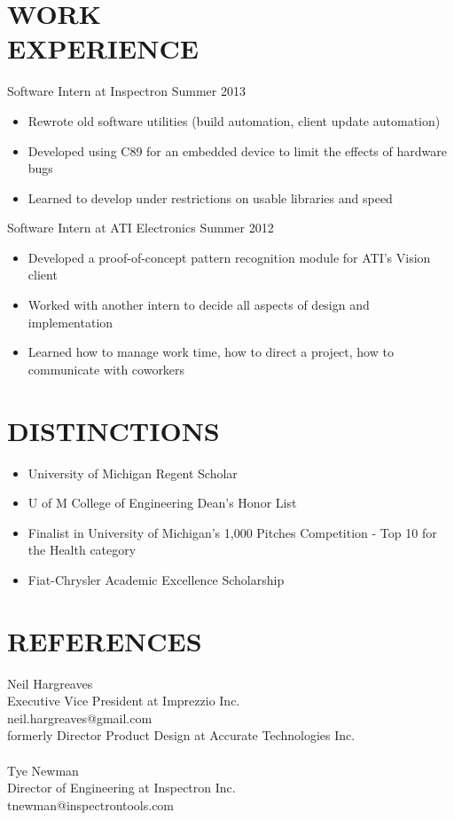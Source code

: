 \documentclass[line,margin]{res}
\begin{document}
\begin{resume}
\section{\textcolor{HeaderColor}{WORK \\ EXPERIENCE}} {\sc Software Intern at Inspectron} \hfill Summer 2013
                 \begin{itemize}  \itemsep -2pt %
                 \item Rewrote old software utilities (build automation, client update automation)
                 \item Developed using C89 for an embedded device to limit the effects of hardware bugs
                 \item Learned to develop under restrictions on usable libraries and speed
                 \end{itemize}
 
                {\sc Software Intern at ATI Electronics} \hfill            Summer 2012
                 \begin{itemize}  \itemsep -2pt %
                 \item Developed a proof-of-concept pattern recognition module for ATI’s Vision client
                 \item Worked with another intern to decide all aspects of design and implementation
                 \item Learned how to manage work time, how to direct a project, how to communicate with coworkers
                 \end{itemize} 

\section{\textcolor{HeaderColor}{DISTINCTIONS}}
    \begin{itemize} \itemsep-0.2em
    \item University of Michigan Regent Scholar
    \item U of M College of Engineering Dean’s Honor List
    \item Finalist in University of Michigan’s 1,000 Pitches Competition - Top 10 for the Health category
    \item Fiat-Chrysler Academic Excellence Scholarship
    \end{itemize}
 
\section{\textcolor{HeaderColor}{REFERENCES}}
    Neil Hargreaves\\
    Executive Vice President at Imprezzio Inc.\\
    neil.hargreaves@gmail.com\\
    formerly Director Product Design at Accurate Technologies Inc.\\
\\
    Tye Newman\\
    Director of Engineering at Inspectron Inc.\\
    tnewman@inspectrontools.com\\
 

\end{resume}
\end{document}
